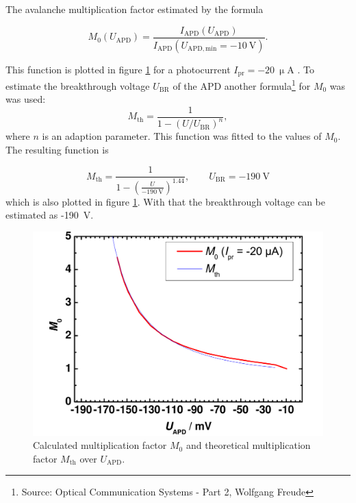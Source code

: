 The avalanche multiplication factor estimated by the formula

\begin{equation}
M_0(U_{\mathrm{APD}})=\frac{I_{\mathrm{APD}}(U_{\mathrm{APD}})}{I_{\mathrm{APD}}(U_{\mathrm{APD,min}}=-10\mathrm{~V})}.
\label{eq:M0}
\end{equation}

This function is plotted in figure \ref{fig:T3_3} for a photocurrent $I_{\mathrm{pr}}=-20~\upmu$A . To estimate the breakthrough voltage $U_{\mathrm{BR}}$ of the APD another formula\footnote[2]{Source: Optical Communication Systems - Part 2, Wolfgang Freude} for $M_0$ was was used:
\begin{equation}
M_{\mathrm{th}} = \frac{1}{1-(U/U_{\mathrm{BR}})^n},
\label{eq:Mth}
\end{equation}
where $n$ is an adaption parameter. 
This function was fitted to the values of $M_0$. The resulting function is

\begin{equation}
M_{\mathrm{th}} = \frac{1}{1-(\frac{U}{-190~\mathrm{V}})^{1.44}},\qquad U_{\mathrm{BR}}=-190~\mathrm{V}
\label{eq:M_fit}
\end{equation}
which is also plotted in figure \ref{fig:T3_3}.
With that the breakthrough voltage can be estimated as -190~V.

\begin{figure}%
\centering
\includegraphics[width=.5\columnwidth]{Grafiken/T3_3.pdf}%
\caption{Calculated multiplication factor $M_0$ and theoretical multiplication factor $M_{\mathrm{th}}$ over $U_{\mathrm{APD}}$.}%
\label{fig:T3_3}%
\end{figure}